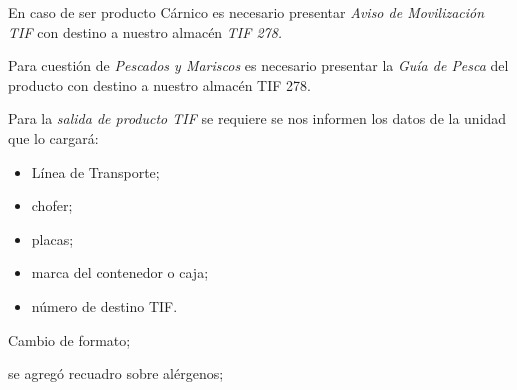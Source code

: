 En caso de ser producto Cárnico es necesario presentar \emph{Aviso de Movilización TIF} con destino a nuestro almacén \emph{TIF 278.}

Para cuestión de \emph{Pescados y Mariscos} es necesario presentar la \emph{Guía de Pesca} del producto con destino a nuestro almacén TIF 278.

Para la \emph{salida de producto TIF} se requiere se nos informen los datos de la unidad que lo cargará: 
\begin{itemize}
	\item Línea de Transporte;
	\item chofer;
	\item placas;
	\item marca del contenedor o caja;
	\item número de destino TIF.
\end{itemize}


\begin{changelog}[simple, sectioncmd=\subsection*,label=changelog-2.6]
	\begin{version}[v=2.1, date=2023--01, author=Pablo E. Alanis]
		\item Cambio de formato;
		\item se agregó recuadro sobre alérgenos;
	\end{version}
\end{changelog}
